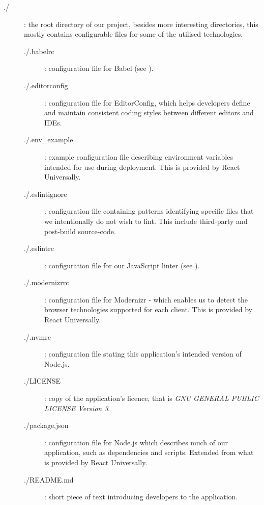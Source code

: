 \documentclass{standalone}
\begin{document}
		\begin{formal}
			\begin{description}
					\item[./]: the root directory of our project, besides more interesting directories, this mostly contains configurable files for some of the utilised technologies.
					\begin{description}
	        	\item[./.babelrc]: configuration file for Babel (see ).

	        	\item[./.editorconfig]: configuration file for EditorConfig, which helps developers define and maintain consistent coding styles between different editors and IDEs.

	        	\item[./.env\_example]: example configuration file describing environment variables intended for use during deployment. This is provided by React Universally.

	        	\item[./.eslintignore]: configuration file containing patterns identifying specific files that we intentionally do not wish to lint. This include third-party and post-build source-code.

	        	\item[./.eslintrc]: configuration file for our JavaScript linter (see ).

	        	\item[./.modernizrrc]: configuration file for Modernizr - which enables us to detect the browser technologies supported for each client. This is provided by React Universally.

	        	\item[./.nvmrc]: configuration file stating this application's intended version of Node.js.

	        	\item[./LICENSE]: copy of the application's licence, that is \emph{GNU GENERAL PUBLIC LICENSE Version 3}.

	        	\item[./package.json]: configuration file for Node.js which describes much of our application, such as dependencies and scripts. Extended from what is provided by React Universally.

	        	\item[./README.md]: short piece of text introducing developers to the application.


\end{description}
\end{description}
\end{formal}
\end{document}
